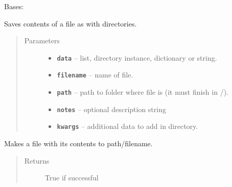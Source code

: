 \documentclass[letterpaper,10pt,english]{sphinxmanual}
\begin{document}
\begin{fulllineitems}
\label{RRtoolbox.lib:RRtoolbox.lib.directory.FileDirectory}
Bases: {\hyperref[RRtoolbox.lib:RRtoolbox.lib.directory.Directory]{\emph{}}}

Saves contents of a file as with directories.
\begin{quote}\begin{description}
\item[{Parameters}] \leavevmode\begin{itemize}
\item {} 
\textbf{\texttt{data}} -- list, directory instance, dictionary or string.

\item {} 
\textbf{\texttt{filename}} -- name of file.

\item {} 
\textbf{\texttt{path}} -- path to folder where file is (it must finish in /).

\item {} 
\textbf{\texttt{notes}} -- optional description string

\item {} 
\textbf{\texttt{kwargs}} -- additional data to add in directory.

\end{itemize}

\end{description}\end{quote}

\begin{fulllineitems}
\label{RRtoolbox.lib:RRtoolbox.lib.directory.FileDirectory.makeFile}
Makes a file with its contents to path/filename.
\begin{quote}\begin{description}
\item[{Returns}] \leavevmode
True if successful

\end{description}\end{quote}

\end{fulllineitems}


\end{fulllineitems}

\end{document}

